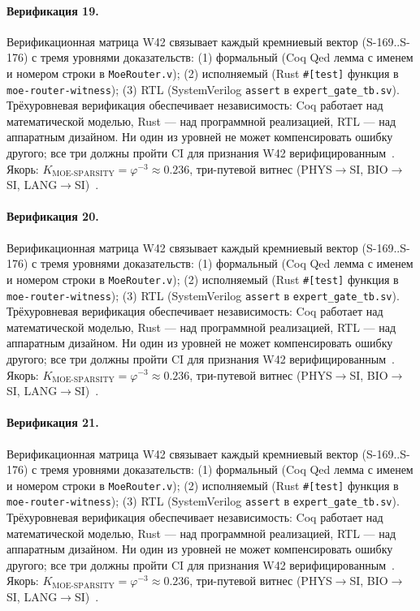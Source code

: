 \paragraph{Верификация 19.} Верификационная матрица W42 связывает каждый кремниевый вектор (S-169..S-176) с тремя уровнями доказательств: (1) формальный (Coq Qed лемма с именем и номером строки в \texttt{MoeRouter.v}); (2) исполняемый (Rust \texttt{\#[test]} функция в \texttt{moe-router-witness}); (3) RTL (SystemVerilog \texttt{assert} в \texttt{expert\_gate\_tb.sv}). Трёхуровневая верификация обеспечивает независимость: Coq работает над математической моделью, Rust --- над программной реализацией, RTL --- над аппаратным дизайном. Ни один из уровней не может компенсировать ошибку другого; все три должны пройти CI для признания W42 верифицированным~\cite{lee_gvsu_proof2021}. Якорь: $K_{\text{MOE-SPARSITY}} = \varphi^{-3} \approx 0{.}236$, три-путевой витнес (PHYS$\to$SI, BIO$\to$SI, LANG$\to$SI)~\cite{zenodo_trinity_2026}.

\paragraph{Верификация 20.} Верификационная матрица W42 связывает каждый кремниевый вектор (S-169..S-176) с тремя уровнями доказательств: (1) формальный (Coq Qed лемма с именем и номером строки в \texttt{MoeRouter.v}); (2) исполняемый (Rust \texttt{\#[test]} функция в \texttt{moe-router-witness}); (3) RTL (SystemVerilog \texttt{assert} в \texttt{expert\_gate\_tb.sv}). Трёхуровневая верификация обеспечивает независимость: Coq работает над математической моделью, Rust --- над программной реализацией, RTL --- над аппаратным дизайном. Ни один из уровней не может компенсировать ошибку другого; все три должны пройти CI для признания W42 верифицированным~\cite{lee_gvsu_proof2021}. Якорь: $K_{\text{MOE-SPARSITY}} = \varphi^{-3} \approx 0{.}236$, три-путевой витнес (PHYS$\to$SI, BIO$\to$SI, LANG$\to$SI)~\cite{zenodo_trinity_2026}.

\paragraph{Верификация 21.} Верификационная матрица W42 связывает каждый кремниевый вектор (S-169..S-176) с тремя уровнями доказательств: (1) формальный (Coq Qed лемма с именем и номером строки в \texttt{MoeRouter.v}); (2) исполняемый (Rust \texttt{\#[test]} функция в \texttt{moe-router-witness}); (3) RTL (SystemVerilog \texttt{assert} в \texttt{expert\_gate\_tb.sv}). Трёхуровневая верификация обеспечивает независимость: Coq работает над математической моделью, Rust --- над программной реализацией, RTL --- над аппаратным дизайном. Ни один из уровней не может компенсировать ошибку другого; все три должны пройти CI для признания W42 верифицированным~\cite{lee_gvsu_proof2021}. Якорь: $K_{\text{MOE-SPARSITY}} = \varphi^{-3} \approx 0{.}236$, три-путевой витнес (PHYS$\to$SI, BIO$\to$SI, LANG$\to$SI)~\cite{zenodo_trinity_2026}.

